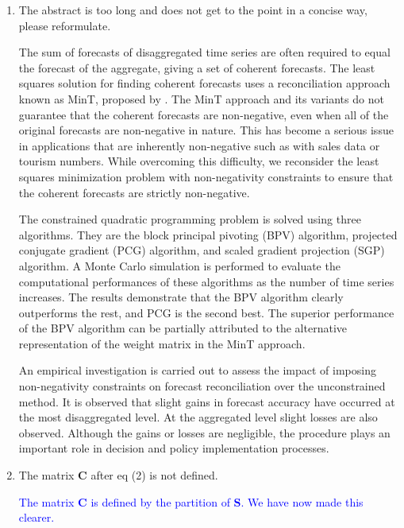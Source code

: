 \documentclass[10pt,a4paper]{article}
\begin{document}
\begin{enumerate}
\item
  The abstract is too long and does not get to the point in a concise way, please reformulate.

  {\color{blue}
  The sum of forecasts of disaggregated time series are often required to equal the forecast of the aggregate, giving a set of coherent forecasts. The least squares solution for finding coherent forecasts uses a reconciliation approach known as MinT, proposed by \citet{Wick2018}. The MinT approach and its variants do not guarantee that the coherent forecasts are non-negative, even when all of the original forecasts are non-negative in nature. This has become a serious issue in applications that are inherently non-negative such as with sales data or tourism numbers. While overcoming this difficulty, we reconsider the least squares minimization problem with non-negativity constraints to ensure that the coherent forecasts are strictly non-negative.

  The constrained quadratic programming problem is solved using three algorithms. They are the block principal pivoting (BPV) algorithm, projected conjugate gradient (PCG) algorithm, and scaled gradient projection (SGP) algorithm. A Monte Carlo simulation is performed to evaluate the computational performances of these algorithms as the number of time series increases. The results demonstrate that the BPV algorithm clearly outperforms the rest, and PCG is the second best. The superior performance of the BPV algorithm can be partially attributed to the alternative representation of the weight matrix in the MinT approach.

  An empirical investigation is carried out to assess the impact of imposing non-negativity constraints on forecast reconciliation over the unconstrained method. It is observed that slight gains in forecast accuracy have occurred at the most disaggregated level. At the aggregated level slight losses are also observed. Although the gains or losses are negligible, the procedure plays an important role in decision and policy implementation processes.}

\item
  The matrix $\bm{C}$ after eq (2) is not defined.

  \textcolor{blue}{The matrix $\bm{C}$ is defined by the partition of $\bm{S}$. We have now made this clearer.}



\end{enumerate}
\end{document}
